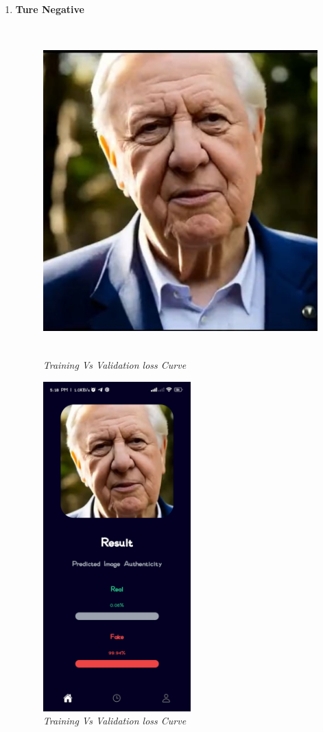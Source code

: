 \begin{enumerate}
          \newpage

    \item \textbf{Ture Negative}
          \begin{figure}[ht]
              \centering
              \includegraphics[width= 5in, height =5in ]{img/oldman.jpg}
              \caption{\textit{Training Vs Validation loss Curve}}
          \end{figure}
          \begin{figure}[ht]
              \centering
              \includegraphics[height =5in ]{img/oldmanResult.jpg}
              \caption{\textit{Training Vs Validation loss Curve}}
          \end{figure}


\end{enumerate}

